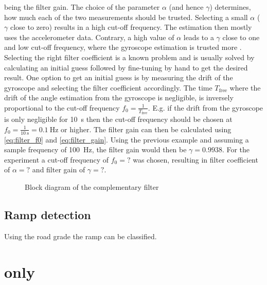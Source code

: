being the filter gain.
The choice of the parameter $\alpha$ (and hence $\gamma$) determines, how much each of the two measurements should be trusted.
Selecting a small $\alpha$ ($\gamma$ close to zero) results in a high cut-off frequency.
The estimation then mostly uses the accelerometer data.
Contrary, a high value of $\alpha$ leads to a $\gamma$ close to one and low cut-off frequency, where the gyroscope estimation is trusted more \cite{1997Baerveldt}.\\
Selecting the right filter coefficient is a known problem and is usually solved by calculating an initial guess followed by fine-tuning by hand to get the desired result.
One option to get an initial guess is by measuring the drift of the gyroscope and selecting the filter coefficient accordingly.
The time $T_\mathrm{free}$ where the drift of the angle estimation from the gyroscope is negligible, is inversely proportional to the cut-off frequency $f_0 = \frac{1}{T_\mathrm{free}}$.
E.g. if the drift from the gyroscope is only negligible for \SI{10}{\second} then the cut-off frequency should be chosen at $f_0 = \frac{1}{\SI{10}{\second}} = \SI{0.1}{\hertz}$ or higher.
The filter gain can then be calculated using \cref{eq:filter_f0} and \cref{eq:filter_gain}.
Using the previous example and assuming a sample frequency of \SI{100}{\hertz}, the filter gain would then be $\gamma = 0.9938$.
For the experiment a cut-off frequency of $f_0=?$ was chosen, resulting in filter coefficient of $\alpha = ?$ and filter gain of $\gamma = ?$.
\begin{figure}[htb]
	\centering
	
	\caption{Block diagram of the complementary filter}
	\label{fig:tikz_complementary_filter}
\end{figure}


\subsection{Ramp detection}
Using the road grade the ramp can be classified.

\section{ only}
